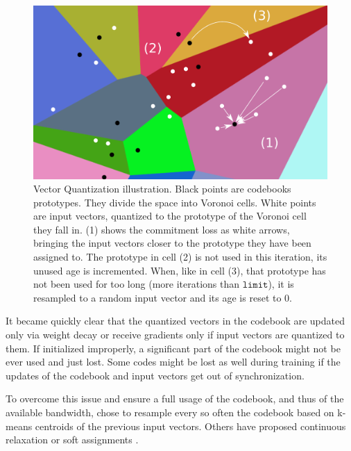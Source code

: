 \begin{figure}[ht]
    \centering
    \includegraphics[scale=0.5]{60-files/vq.pdf}
    \caption{Vector Quantization illustration. Black points are codebooks prototypes. They divide the space into Voronoi cells. White points are input vectors, quantized to the prototype of the Voronoi cell they fall in. (1) shows the commitment loss as white arrows, bringing the input vectors closer to the prototype they have been assigned to. The prototype in cell (2) is not used in this iteration, its unused age is incremented. When, like in cell (3), that prototype has not been used for too long (more iterations than $\texttt{limit}$), it is resampled to a random input vector and its age is reset to 0. }
    \label{fig:vq-resample}
\end{figure}

It became quickly clear that the quantized vectors in the codebook are updated only via weight decay or receive gradients only if input vectors are quantized to them. If initialized improperly, a significant part of the codebook might not be ever used and just lost. Some codes might be lost as well during training if the updates of the codebook and input vectors get out of synchronization.

To overcome this issue and ensure a full usage of the codebook, and thus of the available bandwidth, \citet{robustvq} chose to resample every so often the codebook based on k-means centroids of the previous input vectors. Others have proposed continuous relaxation \citep{continuousvq} or soft assignments \citep{softvq}.

